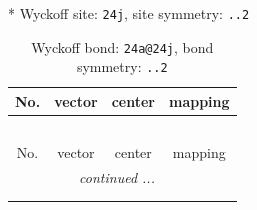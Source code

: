 \documentclass[fleqn,8pt]{jsarticle}
\begin{document}
* Wyckoff site: {\tt 24j}, site symmetry: {\tt ..2}
\renewcommand{\arraystretch}{1.2}
\begin{longtable}{cccc}
\caption{Wyckoff bond: {\tt 24a@24j}, bond symmetry: {\tt ..2}}
 \\
 \hline \hline
No. & vector & center & mapping \\ \hline \endfirsthead

\multicolumn{3}{l}{\tablename\ \thetable{}} \\
 \hline \hline
No. & vector & center & mapping \\ \hline \endhead

 \hline \hline
\multicolumn{3}{r}{\footnotesize\it continued ...} \\ \endfoot

 \hline \hline
\multicolumn{3}{r}{} \\ \endlastfoot


\end{longtable}
\end{document}
